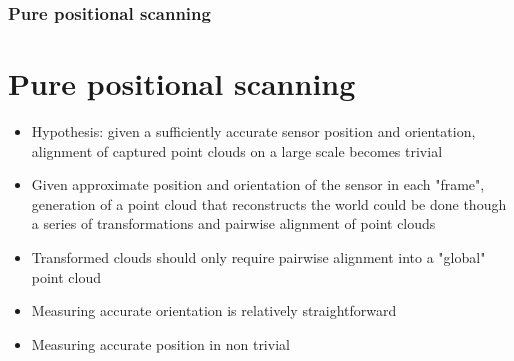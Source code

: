 \documentclass[10pt,serif,t]{beamer}
\newenvironment{Slide}[1]
{
  \begin{frame}[fragile,environment=Slide]
    \frametitle{#1}
    \section{#1}
  }
  {
  \end{frame}
}
\begin{document}
\begin{Slide}{Pure positional scanning}
  \begin{itemize}
    \item
      Hypothesis: given a sufficiently accurate sensor position and orientation,
      alignment of captured point clouds on a large scale becomes trivial

      \vspace{1em}

      \pause

    \item
      Given approximate position and orientation of the sensor in each "frame",
      generation of a point cloud that reconstructs the world could be done
      though a series of transformations and pairwise alignment of point clouds

    \item
      Transformed clouds should only require pairwise alignment into a "global"
      point cloud

      \vspace{1em}

      \pause

    \item
      Measuring accurate orientation is relatively straightforward

    \item
      Measuring accurate position in non trivial

  \end{itemize}
\end{Slide}
\end{document}
